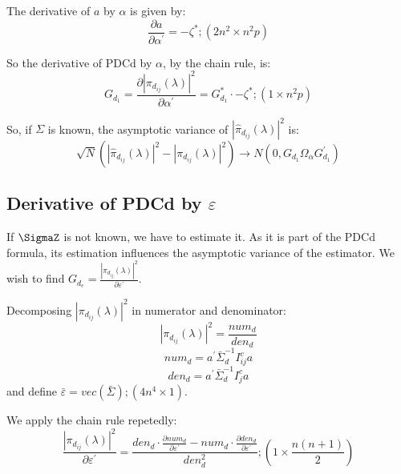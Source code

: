 \documentclass[a4paper,10pt]{article}
\begin{document}
The derivative of $a$ by $\alpha$ is given by:
\begin{equation}
\frac{\partial a}{\partial \alpha^{'}} = -\zeta^{\ast}; (2n^{2} \times n^{2}p)
\end{equation}

So the derivative of PDCd by $\alpha$, by the chain rule, is:
\begin{equation}
G_{d_1} = \frac{\partial |\pi_{d_{ij}}(\lambda)|^{2}}{\partial \alpha^{'}} = G_{d_1}^{\ast} \cdot -\zeta^{\ast}; (1 \times n^{2}p)
\end{equation}

So, if $\Sigma$ is known, the asymptotic variance of $|\hat{\pi}_{d_{ij}}(\lambda)|^{2}$ is:
\begin{equation}
\sqrt{N} (|\hat{\pi}_{d_{ij}}(\lambda)|^{2} - |\pi_{d_{ij}}(\lambda)|^{2}) \to N(0, G_{d_1} \Omega_{\alpha} G_{d_1}^{'}) 
\end{equation}

\subsection{Derivative of PDCd by $\varepsilon$}

If $\SigmaZ$ is not known, we have to estimate it. As it is part of the PDCd formula, its estimation influences the asymptotic variance of the estimator. We wish to find  $G_{d_e} = \frac{|\pi_{d_{ij}}(\lambda)|^{2}}{\partial \varepsilon^{'}}$.

Decomposing $|\pi_{d_{ij}}(\lambda)|^{2}$ in numerator and denominator:
\begin{equation}
|\pi_{d_{ij}}(\lambda)|^{2} = \frac{num_{d}}{den_{d}}
\end{equation}
\begin{equation}
num_{d} = a^{'} \bar{\Sigma}_{d}^{-1} I_{ij}^{c} a
\end{equation}
\begin{equation}
den_{d} = a^{'} \bar{\Sigma}_{d}^{-1} I_{j}^{c} a
\end{equation}
and define $\bar{\varepsilon} = vec(\bar{\Sigma}); (4n^{4} \times 1)$.

We apply the chain rule repetedly:
\begin{equation}
\frac{|\pi_{d_{ij}}(\lambda)|^{2}}{\partial \varepsilon^{'}} = \frac{den_{d} \cdot \frac{\partial num_{d}}{\partial \varepsilon^{'}} - num_{d} \cdot \frac{\partial den_{d}}{\partial \varepsilon^{'}}}{den_{d}^{2}}; (1 \times \frac{n(n+1)}{2})
\end{equation}
\end{document}
